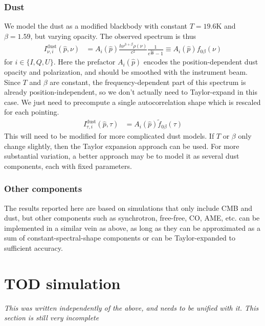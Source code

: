 \documentclass{article}
\begin{document}
\subsubsection{Dust}
We model the dust as a modified blackbody with constant
$T=19.6$K and $\beta=1.59$, but varying opacity. The observed spectrum is thus
\begin{align}
I^\textrm{dust}_{\nu,i}(\hat p,\nu) &= A_i(\hat p) \frac{h\nu^{3+\beta}\rho(\nu)}{c^2}\frac{1}{e^{\frac{h\nu}{kT}}-1} \equiv A_i(\hat p) f_{0\beta}(\nu)
\end{align}
for $i \in \{I,Q,U\}$. Here the prefactor $A_i(\hat p)$ encodes the position-dependent
dust opacity and polarization, and should be smoothed with the instrument beam.
Since $T$ and $\beta$ are constant, the frequency-dependent part of this spectrum is
already position-independent, so we don't actually need to Taylor-expand in this case.
We just need to precompute a single autocorrelation shape which is rescaled for each
pointing.
\begin{align}
I^\textrm{dust}_{\tau,i}(\hat p,\tau) &= A_i(\hat p) \tilde f_{0\beta}(\tau)
\end{align}
This will need to be modified for more complicated dust models. If $T$ or $\beta$
only change slightly, then the Taylor expansion approach can be used. For more
substantial variation, a better approach may be to model it as several dust components,
each with fixed parameters.

\subsubsection{Other components}
The results reported here are based on simulations that only include CMB and dust,
but other components such as synchrotron, free-free, CO, AME, etc. can be implemented
in a similar vein as above, as long as they can be approximated as a sum of
constant-spectral-shape components or can be Taylor-expanded to sufficient accuracy.

\section{TOD simulation}
\emph{This was written independently of the above, and needs to be unified with it.
This section is still very incomplete}
\end{document}
